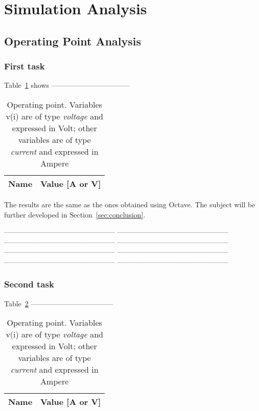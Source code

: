 \section{Simulation Analysis}
\label{sec:simulation}

\subsection{Operating Point Analysis}

\subsubsection{First task}

Table~\ref{tab:op1} shows ---------------------------------

\begin{table}[H]
  \centering
  \begin{tabular}{|l|r|}
    \hline    
    {\bf Name} & {\bf Value [A or V]} \\ \hline
    
  \end{tabular}
  \caption{Operating point. Variables v(i) are of type {\it voltage} and expressed in
    Volt; other variables are of type {\it current} and expressed in Ampere}
  \label{tab:op1}
\end{table}

The results are the same as the ones obtained using Octave. The subject will be further developed in Section~\ref{sec:conclusion}.

-----------------------------------------------
-----------------------------------------------
-----------------------------------------------
-----------------------------------------------
-----------------------------------------------
-----------------------------------------------
-----------------------------------------------
-----------------------------------------------

\subsubsection{Second task}

Table~\ref{tab:op2} ----------------------------------- 

\begin{table}[H]
  \centering
  \begin{tabular}{|l|r|}
    \hline    
    {\bf Name} & {\bf Value [A or V]} \\ \hline
    
  \end{tabular}
  \caption{Operating point. Variables v(i) are of type {\it voltage} and expressed in
    Volt; other variables are of type {\it current} and expressed in Ampere}
  \label{tab:op2}
\end{table}

